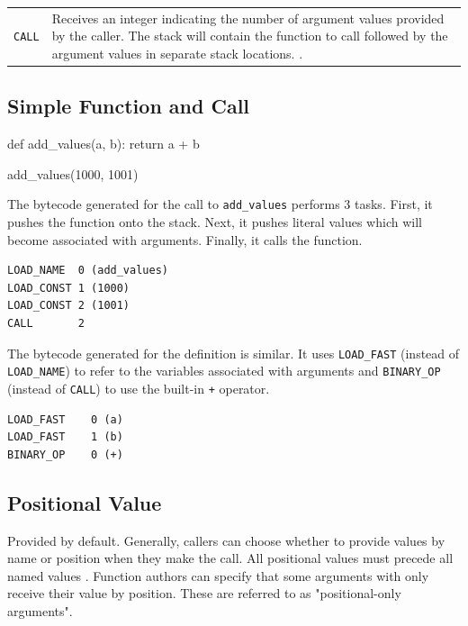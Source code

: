 \begin{tabularx}{\columnwidth}{r X}
	\texttt{CALL} &
		Receives an integer indicating the number of argument values provided by the caller.
		The stack will contain the function to call followed by the argument values in
		separate stack locations.
		\parencite[][Doc/library/dis.rst lines 1398-1410,
		             Python/ceval.c lines 1314-1536
		]{python-source}. \\
\end{tabularx}

\subsection{Simple Function and Call}

\begin{pygmented}[lang=python]
def add_values(a, b):
    return a + b

add_values(1000, 1001)
\end{pygmented}

The bytecode generated for the call to \texttt{add\_values} performs 3 tasks.
First, it pushes the function onto the stack.
Next, it pushes literal values which will become associated with arguments.
Finally, it calls the function.

\begin{verbatim}
LOAD_NAME  0 (add_values)
LOAD_CONST 1 (1000)
LOAD_CONST 2 (1001)
CALL       2
\end{verbatim}

The bytecode generated for the definition is similar.
It uses \texttt{LOAD\_FAST} (instead of \texttt{LOAD\_NAME}) to refer to the variables
associated with arguments and \texttt{BINARY\_OP} (instead of \texttt{CALL}) to use the
built-in \texttt{+} operator.

\begin{verbatim}
LOAD_FAST    0 (a)
LOAD_FAST    1 (b)
BINARY_OP    0 (+)
\end{verbatim}

\subsection{Positional Value}
Provided by default.
Generally, callers can choose whether to provide values by name or position when they
make the call.
All positional values must precede all named values
\parencite[][reference/expressions.html section 6.3.4 "Calls"]{python-doc-html}.
Function authors can specify that some arguments with only receive their value by
position.
These are referred to as "positional-only arguments".


